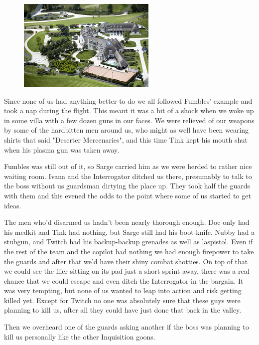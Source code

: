 \begin{figure}
	\begin{center}
		\includegraphics[width=\figwidth]{pics/9/37.png}
	\end{center}
\end{figure}
Since none of us had anything better to do we all followed Fumbles' example and took a nap during the flight. 
This meant it was a bit of a shock when we woke up in some villa with a few dozen guns in our faces. 
We were relieved of our weapons by some of the hardbitten men around us, who might as well have been wearing shirts that said "Deserter Mercenaries", and this time Tink kept his mouth shut when his plasma gun was taken away.

Fumbles was still out of it, so Sarge carried him as we were herded to rather nice waiting room. 
Ivana and the Interrogator ditched us there, presumably to talk to the boss without us guardsman dirtying the place up. 
They took half the guards with them and this evened the odds to the point where some of us started to get ideas.

The men who'd disarmed us hadn't been nearly thorough enough. 
Doc only had his medkit and Tink had nothing, but Sarge still had his boot-knife, Nubby had a stubgun, and Twitch had his backup-backup grenades as well as laspistol. 
Even if the rest of the team and the copilot had nothing we had enough firepower to take the guards and after that we'd have their shiny combat shotties. 
On top of that we could see the flier sitting on its pad just a short sprint away, there was a real chance that we could escape and even ditch the Interrogator in the bargain. 
It was very tempting, but none of us wanted to leap into action and risk getting killed yet. 
Except for Twitch no one was absolutely sure that these guys were planning to kill us, after all they could have just done that back in the valley.

Then we overheard one of the guards asking another if the boss was planning to kill us personally like the other Inquisition goons.

